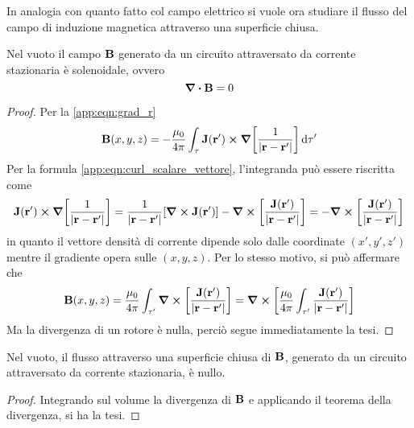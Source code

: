 In analogia con quanto fatto col campo elettrico si vuole ora studiare
il flusso del campo di induzione magnetica attraverso una superficie chiusa.
\begin{thm}
    Nel vuoto il campo $\vb{B}$ generato da un circuito attraversato da corrente stazionaria è solenoidale, ovvero
    \begin{equation}
        \div{\vb{B}}=0
    \end{equation}
\end{thm}
\begin{proof}
    Per la \eqref{app:eqn:grad_r}
    \[
        \vb{B}(x,y,z)=-\frac{\mu_0}{4\pi}\int_\tau \vb{J}(\vb{r}')\cp\grad[\rec{\abs{\vb{r}-\vb{r}'}}]\dd{\tau'}
    \]
    Per la formula \eqref{app:eqn:curl_scalare_vettore}, l'integranda può essere riscritta come
    \[
        \vb{J}(\vb{r}')\cp\grad[\rec{\abs{\vb{r}-\vb{r}'}}]=
        \rec{\abs{\vb{r}-\vb{r}'}}[\curl{\vb{J}}(\vb{r}')]-\curl[\frac{\vb{J}(\vb{r}')}{\abs{\vb{r}-\vb{r}'}}]=
        -\curl[\frac{\vb{J}(\vb{r}')}{\abs{\vb{r}-\vb{r}'}}]
    \]
    in quanto il vettore densità di corrente dipende solo dalle coordinate $(x',y',z')$ mentre il gradiente opera sulle $(x,y,z)$.
    Per lo stesso motivo, si può affermare che
    \[
        \vb{B}(x,y,z)=\frac{\mu_0}{4\pi}\int_{\tau'} \curl[\frac{\vb{J}(\vb{r}')}{\abs{\vb{r}-\vb{r}'}}]=
        \curl[\frac{\mu_0}{4\pi}\int_{\tau'} \frac{\vb{J}(\vb{r}')}{\abs{\vb{r}-\vb{r}'}}]
    \]
    Ma la divergenza di un rotore è nulla, perciò segue immediatamente la tesi.
\end{proof}
\begin{cor}
    \label{cor:flusso_B}
    Nel vuoto, il flusso attraverso una superficie chiusa di $\vb{B}$, generato da un circuito attraversato da corrente stazionaria,
    è nullo.
\end{cor}
\begin{proof}
    Integrando sul volume la divergenza di $\vb{B}$
    e applicando il teorema della divergenza, si ha la tesi.
\end{proof}

